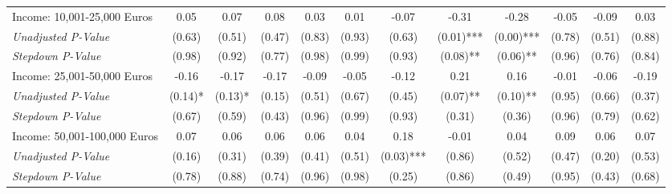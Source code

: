 \begin{tabular}{l c c c c c c c c c c c}
Income: 10,001-25,000 Euros & 0.05 & 0.07 & 0.08 & 0.03 & 0.01 & -0.07 & -0.31 & -0.28 & -0.05 & -0.09 & 0.03 \\
\quad \textit{Unadjusted P-Value} & (0.63) & (0.51) & (0.47) & (0.83) & (0.93) & (0.63) & (0.01)*** & (0.00)*** & (0.78) & (0.51) & (0.88) \\
\quad \textit{Stepdown P-Value} & (0.98) & (0.92) & (0.77) & (0.98) & (0.99) & (0.93) & (0.08)** & (0.06)** & (0.96) & (0.76) & (0.84) \\
Income: 25,001-50,000 Euros & -0.16 & -0.17 & -0.17 & -0.09 & -0.05 & -0.12 & 0.21 & 0.16 & -0.01 & -0.06 & -0.19 \\
\quad \textit{Unadjusted P-Value} & (0.14)* & (0.13)* & (0.15) & (0.51) & (0.67) & (0.45) & (0.07)** & (0.10)** & (0.95) & (0.66) & (0.37) \\
\quad \textit{Stepdown P-Value} & (0.67) & (0.59) & (0.43) & (0.96) & (0.99) & (0.93) & (0.31) & (0.36) & (0.96) & (0.79) & (0.62) \\
Income: 50,001-100,000 Euros & 0.07 & 0.06 & 0.06 & 0.06 & 0.04 & 0.18 & -0.01 & 0.04 & 0.09 & 0.06 & 0.07 \\
\quad \textit{Unadjusted P-Value} & (0.16) & (0.31) & (0.39) & (0.41) & (0.51) & (0.03)*** & (0.86) & (0.52) & (0.47) & (0.20) & (0.53) \\
\quad \textit{Stepdown P-Value} & (0.78) & (0.88) & (0.74) & (0.96) & (0.98) & (0.25) & (0.86) & (0.49) & (0.95) & (0.43) & (0.68) \\
\bottomrule
\end{tabular}
